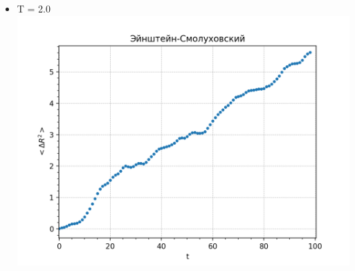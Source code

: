 \begin{minipage}{0.45\textwidth}
\begin{center}
\begin{itemize}
    \item T = 2.0\\
    
    \includegraphics[width=\linewidth]{c.png}\\
    
    \end{itemize}
    \end{center}
\end{minipage}
\hfill{}\hfill
